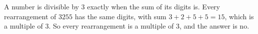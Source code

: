 A number is divisible by $3$ exactly when the sum of its digits is. Every rearrangement of $3255$ has the same digits, with sum $3+2+5+5=15$, which is a multiple of $3$. So every rearrangement is a multiple of $3$, and the answer is $\boxed{\text{no}}$.
